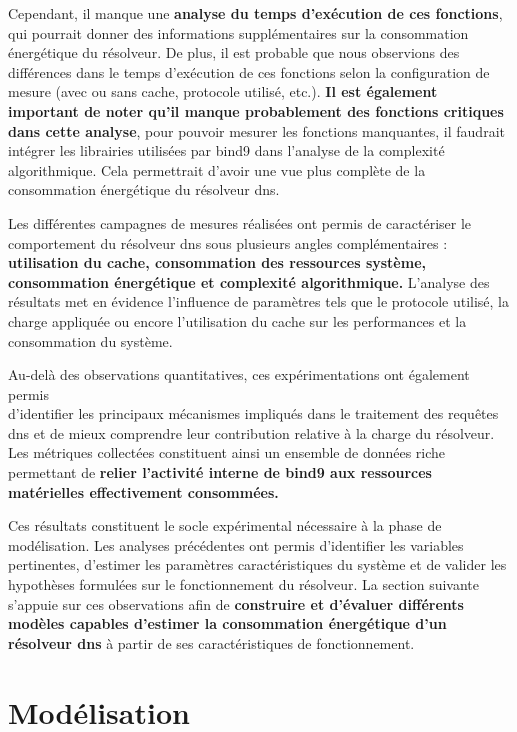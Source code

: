 \documentclass[12pt, a4paper]{report}
\begin{document}
	Cependant, il manque une \textbf{analyse du temps d'exécution de ces fonctions}, qui pourrait donner des informations supplémentaires sur la consommation énergétique du résolveur. De plus, il est probable que nous observions des différences dans le temps d'exécution de ces fonctions selon la configuration de mesure (avec ou sans cache, protocole utilisé, etc.). \textbf{Il est également important de noter qu'il manque probablement des fonctions critiques dans cette analyse}, pour pouvoir mesurer les fonctions manquantes, il faudrait intégrer les librairies utilisées par \gls{bind9} dans l'analyse de la complexité algorithmique. Cela permettrait d'avoir une vue plus complète de la consommation énergétique du résolveur \gls{dns}.


	Les différentes campagnes de mesures réalisées ont permis de caractériser le comportement du résolveur \gls{dns} sous plusieurs angles complémentaires : \textbf{utilisation du cache, consommation des ressources système, consommation énergétique et complexité algorithmique.} L'analyse des résultats met en évidence l'influence de paramètres tels que le protocole utilisé, la charge appliquée ou encore l'utilisation du cache sur les performances et la consommation du système.

	Au-delà des observations quantitatives, ces expérimentations ont également permis\\ d'identifier les principaux mécanismes impliqués dans le traitement des requêtes \gls{dns} et de mieux comprendre leur contribution relative à la charge du résolveur. Les métriques collectées constituent ainsi un ensemble de données riche permettant de \textbf{relier l'activité interne de \gls{bind9} aux ressources matérielles effectivement consommées.}

	Ces résultats constituent le socle expérimental nécessaire à la phase de modélisation. Les analyses précédentes ont permis d'identifier les variables pertinentes, d'estimer les paramètres caractéristiques du système et de valider les hypothèses formulées sur le fonctionnement du résolveur. La section suivante s'appuie sur ces observations afin de \textbf{construire et d'évaluer différents modèles capables d'estimer la consommation énergétique d'un résolveur \gls{dns}} à partir de ses caractéristiques de fonctionnement.


	\section{Modélisation}
	
\end{document}
